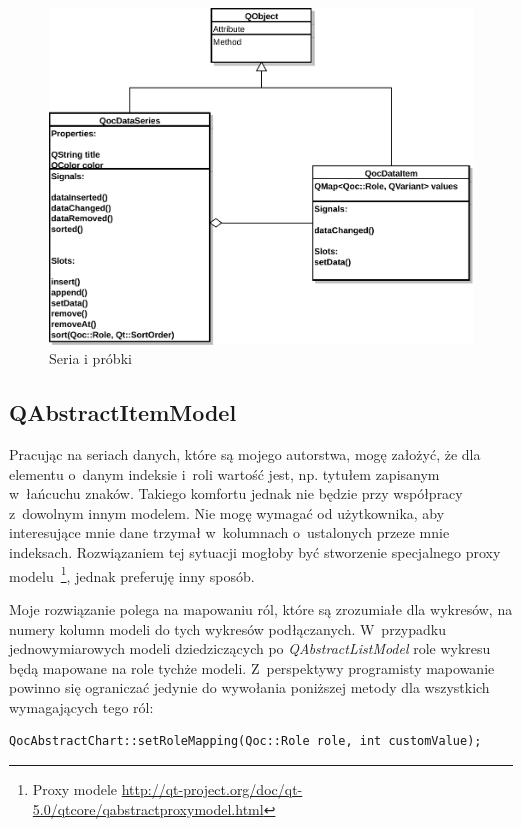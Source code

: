 \begin{figure}[H]
\centering
\includegraphics[scale=0.8]{img/seria_danych.pdf}
\caption{Seria i próbki}\label{rys:seria}
\end{figure}

\subsection{QAbstractItemModel}
Pracując na seriach danych, które są mojego autorstwa, mogę założyć, że dla elementu o~danym indeksie i~roli wartość jest, np. tytułem zapisanym w~łańcuchu znaków. Takiego komfortu jednak nie będzie przy współpracy z~dowolnym innym modelem. Nie mogę wymagać od użytkownika, aby interesujące mnie dane trzymał w~kolumnach o~ustalonych przeze mnie indeksach. Rozwiązaniem tej sytuacji mogłoby być stworzenie specjalnego proxy modelu~\footnote{Proxy modele \url{http://qt-project.org/doc/qt-5.0/qtcore/qabstractproxymodel.html}}, jednak preferuję inny sposób.

Moje rozwiązanie polega na mapowaniu ról, które są zrozumiałe dla wykresów, na numery kolumn modeli do tych wykresów podłączanych. W~przypadku jednowymiarowych modeli dziedziczących po \textit{QAbstractListModel} role wykresu będą mapowane na role tychże modeli. Z~perspektywy programisty mapowanie powinno się ograniczać jedynie do wywołania poniższej metody dla wszystkich wymagających tego ról:

\begin{lstlisting}
QocAbstractChart::setRoleMapping(Qoc::Role role, int customValue);
\end{lstlisting}

